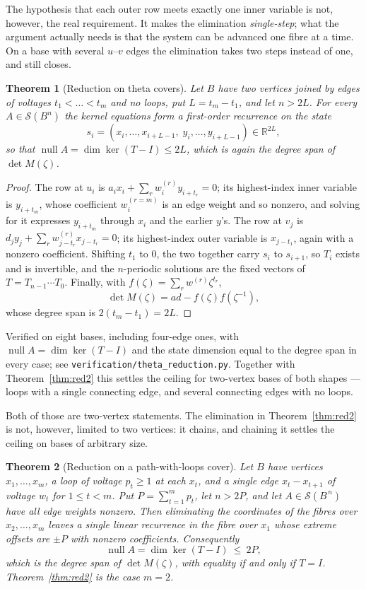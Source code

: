 \documentclass[11pt]{article}
\newtheorem{theorem}{Theorem}
\theoremstyle{definition}
\begin{document}
\noindent
The hypothesis that each outer row meets exactly one inner variable is not,
however, the real requirement. It makes the elimination \emph{single-step}; what
the argument actually needs is that the system can be advanced one fibre at a
time. On a base with several $u$--$v$ edges the elimination takes two steps
instead of one, and still closes.

\begin{theorem}[Reduction on theta covers]\label{thm:theta}
Let $B$ have two vertices joined by edges of voltages $t_1<\dots<t_m$ and no
loops, put $L=t_m-t_1$, and let $n>2L$. For every $A\in\mathcal S(B^n)$ the
kernel equations form a first-order recurrence on the state
\[
  s_i=(x_i,\dots,x_{i+L-1},\;y_i,\dots,y_{i+L-1})\in\mathbb R^{2L},
\]
so that $\operatorname{null}A=\dim\ker(T-I)\le 2L$, which is again the degree
span of $\det M(\zeta)$.
\end{theorem}

\begin{proof}
The row at $u_i$ is $a_ix_i+\sum_r w^{(r)}_iy_{i+t_r}=0$; its highest-index
inner variable is $y_{i+t_m}$, whose coefficient $w^{(r=m)}_i$ is an edge weight
and so nonzero, and solving for it expresses $y_{i+t_m}$ through $x_i$ and the
earlier $y$'s. The row at $v_j$ is $d_jy_j+\sum_r w^{(r)}_{j-t_r}x_{j-t_r}=0$;
its highest-index outer variable is $x_{j-t_1}$, again with a nonzero
coefficient. Shifting $t_1$ to $0$, the two together carry $s_i$ to $s_{i+1}$,
so $T_i$ exists and is invertible, and the $n$-periodic solutions are the fixed
vectors of $T=T_{n-1}\cdots T_0$. Finally, with $f(\zeta)=\sum_r w^{(r)}\zeta^{t_r}$,
\[
  \det M(\zeta)=ad-f(\zeta)f(\zeta^{-1}),
\]
whose degree span is $2(t_m-t_1)=2L$.
\end{proof}

\noindent
Verified on eight bases, including four-edge ones, with
$\operatorname{null}A=\dim\ker(T-I)$ and the state dimension equal to the degree
span in every case; see \texttt{verification/theta\_reduction.py}. Together with
Theorem~\ref{thm:red2} this settles the ceiling for two-vertex bases of both
shapes --- loops with a single connecting edge, and several connecting edges with
no loops.

\noindent
Both of those are two-vertex statements. The elimination in
Theorem~\ref{thm:red2} is not, however, limited to two vertices: it chains, and
chaining it settles the ceiling on bases of arbitrary size.

\begin{theorem}[Reduction on a path-with-loops cover]\label{thm:redpath}
Let $B$ have vertices $x_1,\dots,x_m$, a loop of voltage $p_t\ge1$ at each
$x_t$, and a single edge $x_t\!-\!x_{t+1}$ of voltage $w_t$ for $1\le t<m$. Put
$P=\sum_{t=1}^m p_t$, let $n>2P$, and let $A\in\mathcal S(B^{\,n})$ have all
edge weights nonzero. Then eliminating the coordinates of the fibres over
$x_2,\dots,x_m$ leaves a single linear recurrence in the fibre over $x_1$ whose
extreme offsets are $\pm P$ with nonzero coefficients. Consequently
\[
  \operatorname{null}A=\dim\ker(T-I)\ \le\ 2P ,
\]
which is the degree span of $\det M(\zeta)$, with equality if and only if
$T=I$. Theorem~\ref{thm:red2} is the case $m=2$.
\end{theorem}
\end{document}
